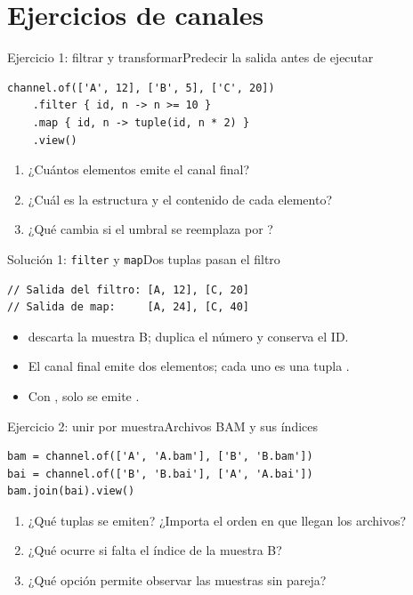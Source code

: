 \documentclass[handout,aspectratio=169,10pt]{beamer}
\newcommand{\code}[1]{\texttt{\detokenize{#1}}}
\begin{document}
\section{Ejercicios de canales}
\begin{frame}[fragile]{Ejercicio 1: filtrar y transformar}{Predecir la salida antes de ejecutar}
\begin{lstlisting}
channel.of(['A', 12], ['B', 5], ['C', 20])
    .filter { id, n -> n >= 10 }
    .map { id, n -> tuple(id, n * 2) }
    .view()
\end{lstlisting}
\begin{enumerate}\setlength\itemsep{8pt}
\item ¿Cuántos elementos emite el canal final?
\item ¿Cuál es la estructura y el contenido de cada elemento?
\item ¿Qué cambia si el umbral se reemplaza por \code{n > 12}?
\end{enumerate}
\end{frame}
\begin{frame}[fragile]{Solución 1: \texttt{filter} y \texttt{map}}{Dos tuplas pasan el filtro}
\begin{lstlisting}
// Salida del filtro: [A, 12], [C, 20]
// Salida de map:     [A, 24], [C, 40]
\end{lstlisting}
\begin{itemize}\setlength\itemsep{7pt}
\item \code{filter} descarta la muestra B; \code{map} duplica el número y conserva el ID.
\item El canal final emite dos elementos; cada uno es una tupla \code{[id, n]}.
\item Con \code{n > 12}, solo se emite \code{[C, 40]}.
\end{itemize}
\end{frame}
\begin{frame}[fragile]{Ejercicio 2: unir por muestra}{Archivos BAM y sus índices}
\begin{lstlisting}
bam = channel.of(['A', 'A.bam'], ['B', 'B.bam'])
bai = channel.of(['B', 'B.bai'], ['A', 'A.bai'])
bam.join(bai).view()
\end{lstlisting}
\begin{enumerate}\setlength\itemsep{8pt}
\item ¿Qué tuplas se emiten? ¿Importa el orden en que llegan los archivos?
\item ¿Qué ocurre si falta el índice de la muestra B?
\item ¿Qué opción permite observar las muestras sin pareja?
\end{enumerate}
\end{frame}
\end{document}
